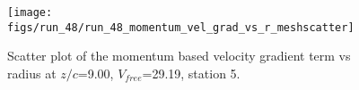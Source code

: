 \begin{figure}[H]
\centering
\texttt{[image: figs/run\_48/run\_48\_momentum\_vel\_grad\_vs\_r\_meshscatter]}
\caption{Scatter plot of the momentum based velocity gradient term vs radius at $z/c$=9.00, $V_{free}$=29.19, station 5.}
\label{fig:run_48_momentum_vel_grad_vs_r_meshscatter}
\end{figure}


